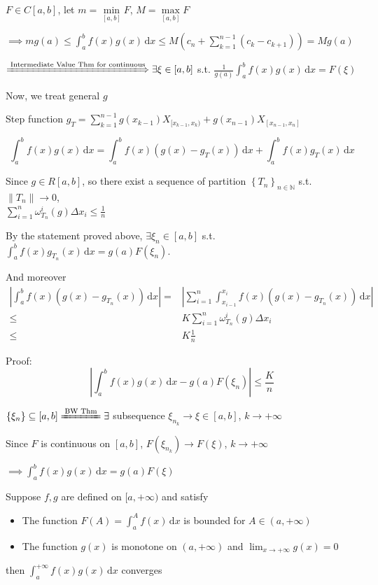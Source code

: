 $F\in C[a,b]$, let $m=\min\limits_{[a,b]}F$, $M=\max\limits_{[a,b]}F$

$\implies mg(a)\leq\int_a^bf(x)g(x)\,\mathrm{d}x\leq M\left(c_n+\sum_{k=1}^{n-1}(c_k-c_{k+1})\right)=Mg(a)$

$\xLongrightarrow{\text{Intermediate Value Thm for continuous}}\exists\xi\in[a,b]$ s.t. $\frac{1}{g(a)}\int_a^bf(x)g(x)\,\mathrm{d}x=F(\xi)$

Now, we treat general $g$

Step function $g_T=\sum_{k=1}^{n-1}g(x_{k-1})X_{[x_{k-1},x_k)}+g(x_{n-1})X_{[x_{n-1},x_n]}$

$$\int_a^bf(x)g(x)\,\mathrm{d}x=\int_a^bf(x)\left(g(x)-g_T(x)\right)\,\mathrm{d}x+\int_a^bf(x)g_T(x)\,\mathrm{d}x$$

Since $g\in R[a,b]$, so there exist a sequence of partition $\left\{T_n\right\}_{n\in\mathbb{N}}$ s.t. $\left\|T_n\right\|\to0$,\\
$\sum_{i=1}^n\omega_{T_n}^i(g)\Delta x_i\leq\frac{1}{n}$

By the statement proved above, $\exists\xi_n\in[a,b]$ s.t. $\int_a^bf(x)g_{T_n}(x)\,\mathrm{d}x=g(a)F(\xi_n)$.

And moreover
\begin{align*}
    \left|\int_a^bf(x)\left(g(x)-g_{T_n}(x)\right)\,\mathrm{d}x\right|= & \left|\sum_{i=1}^n\int_{x_{i-1}}^{x_i}f(x)\left(g(x)-g_{T_n}(x)\right)\,\mathrm{d}x\right| \\
    \leq                                                                & K\sum_{i=1}^n\omega_{T_n}^i(g)\Delta x_i                                                   \\
    \leq                                                                & K\frac{1}{n}
\end{align*}

Proof:
$$\left|\int_a^bf(x)g(x)\,\mathrm{d}x-g(a)F(\xi_n)\right|\leq\frac{K}{n}$$

$\{\xi_n\}\subseteq[a,b]\xlongequal{\text{BW Thm}}\exists$ subsequence $\xi_{n_k}\to\xi\in[a,b]$, $k\to+\infty$

Since $F$ is continuous on $[a,b]$, $F(\xi_{n_k})\to F(\xi)$, $k\to+\infty$

$\implies\int_a^bf(x)g(x)\,\mathrm{d}x=g(a)F(\xi)$

\begin{theorem}
    Suppose $f,g$ are defined on $[a,+\infty)$ and satisfy
    \begin{itemize}
        \item The function $F(A)=\int_a^Af(x)\,\mathrm{d}x$ is bounded for $A\in(a,+\infty)$
        \item The function $g(x)$ is monotone on $(a,+\infty)$ and $\lim_{x\to+\infty}g(x)=0$
    \end{itemize}
    then $\int_a^{+\infty}f(x)g(x)\,\mathrm{d}x$ converges
\end{theorem}

